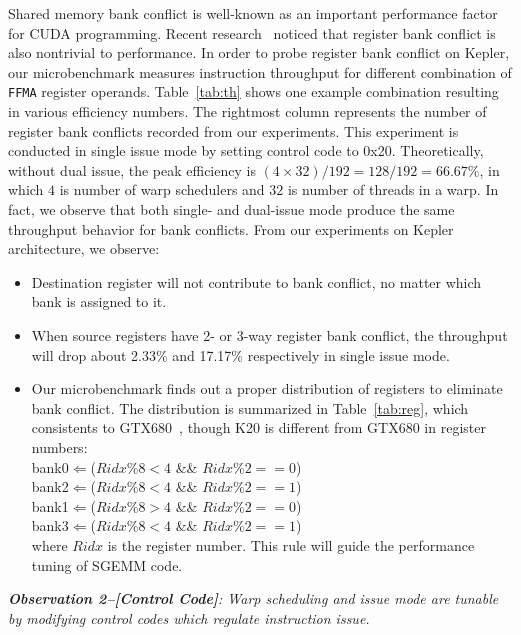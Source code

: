Shared memory bank conflict is well-known as an important performance factor for CUDA programming.
Recent research~\cite{lai} noticed that register bank conflict is also nontrivial to performance.
In order to probe
register bank conflict on Kepler, our microbenchmark measures instruction throughput for different combination of {\tt FFMA}
register operands.
Table~\ref{tab:th} shows one example combination resulting in various efficiency numbers.
The rightmost column represents the number of register bank conflicts recorded from our experiments.
This experiment is conducted in single issue mode by setting control code to 0x20.
Theoretically, without dual issue, the peak efficiency is $(4\times32)/192=128/192=66.67\%$, in which $4$ is number of warp schedulers and $32$
is number of threads in a warp.
In fact, we observe that both single- and dual-issue mode produce the same throughput behavior for bank conflicts.
From our experiments on Kepler architecture, we observe:
\begin{itemize}
\item Destination register will not contribute to bank conflict, no matter which bank is assigned to it.
\item When source registers have 2- or 3-way register bank conflict, the throughput will drop about 2.33\% and 17.17\% respectively in single issue mode.
\item Our microbenchmark finds out a proper distribution of registers to eliminate bank conflict.
     The distribution is summarized in Table~\ref{tab:reg}, which consistents to GTX680~\cite{lai}, though K20 is
        different from GTX680 in register numbers: \\
 bank0$\Leftarrow$($Ridx \% 8 < 4$ \&\& $Ridx \% 2 == 0$) \\
 bank2$\Leftarrow$($Ridx \% 8 < 4$ \&\& $Ridx \% 2 == 1$) \\
bank1$\Leftarrow$($Ridx \% 8 > 4$ \&\& $Ridx \%2 == 0$) \\
bank3$\Leftarrow$($Ridx \% 8 < 4$ \&\& $Ridx\% 2 == 1$)\\
where $Ridx$ is the register number.
This rule will guide the performance tuning of SGEMM code.

\end{itemize}


{\em {\bf Observation 2--[Control Code]}:
Warp scheduling and issue mode are tunable by modifying control codes which regulate instruction issue.}


